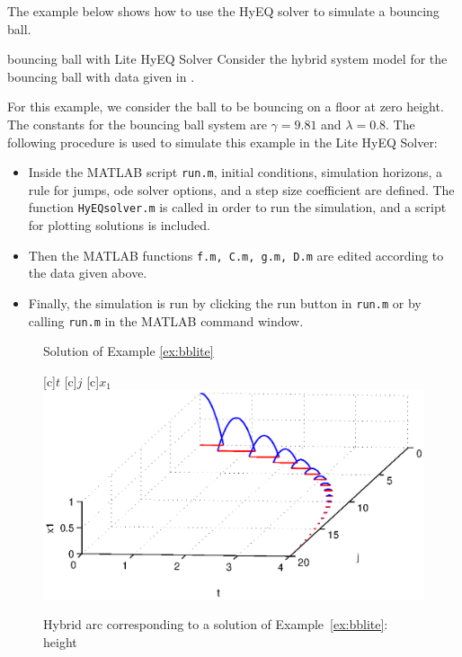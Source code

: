 The example below shows how to use the HyEQ solver to simulate a bouncing ball.

\begin{example}{bouncing ball with Lite HyEQ Solver}
\label{ex:bblite} Consider the hybrid system model for the bouncing ball with data given in .

For this example, we consider the ball to be bouncing on a floor at zero height. The constants for the bouncing ball system are $\gamma = 9.81$ and $\lambda=0.8$.
The following procedure is used to simulate this example in the Lite HyEQ Solver:
\begin{itemize}
\item Inside the MATLAB script {\tt run.m}, initial conditions, simulation horizons, a rule for jumps, ode solver options, and a step size coefficient are defined. The function {\tt HyEQsolver.m} is called in order to run the simulation, and a script for plotting solutions is included.
\item Then the MATLAB functions {\tt f.m, C.m, g.m, D.m} are edited according to the data given above.
\item Finally, the simulation is run by clicking the run button in {\tt run.m} or by calling {\tt run.m} in the MATLAB command window.
\end{itemize}

\begin{figure}[ht]
\begin{center}
\qquad
{}
\end{center}
\caption{Solution of Example \ref{ex:bblite}}
\end{figure}


\begin{figure}[ht]
  \begin{center}
  [c]{$t$}
  [c]{$j$}
  [c]{$x_1$}
    \includegraphics[width=.8\textwidth]{figures/Examples/HybridArclite.eps}
   \caption{Hybrid arc corresponding to a solution of Example~\ref{ex:bblite}: height}
\label{fig:lite-3}
  \end{center}
\end{figure}


\end{example}
